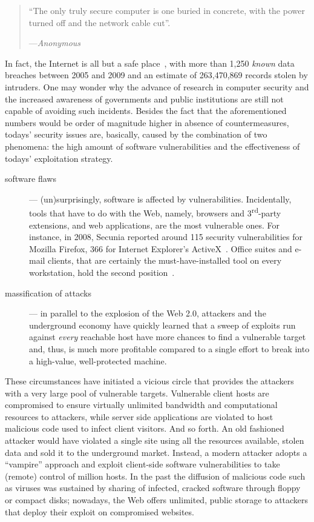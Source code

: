 \begin{quotation}
  ``The only truly secure computer is one buried in concrete, with the
  power turned off and the network cable cut''.

  ---\emph{Anonymous}
\end{quotation}

In fact, the Internet is all but a safe place~\citep{whid}, with more than 1,250 \emph{known} data breaches between 2005 and 2009 \citep{data-breaches-chronology} and an estimate of 263,470,869 records stolen by intruders. One may wonder why the advance of research in computer security and the increased awareness of governments and public institutions are still not capable of avoiding such incidents. Besides the fact that the aforementioned numbers would be order of magnitude higher in absence of countermeasures, todays' security issues are, basically, caused by the combination of two phenomena: the high amount of software vulnerabilities and the effectiveness of todays' exploitation strategy.

\begin{description}
\item[software flaws] --- (un)surprisingly, software is affected by
  vulnerabilities. Incidentally, tools that have to do with the Web,
  namely, browsers and 3\textsuperscript{rd}-party extensions, and web
  applications, are the most vulnerable ones. For instance, in 2008,
  \textsf{Secunia} reported around 115 security vulnerabilities for
  \textsf{Mozilla Firefox}, 366 for \textsf{Internet Explorer}'s
  \textsf{ActiveX}~\citep{secunia2008}. Office suites and e-mail
  clients, that are certainly the must\hyp{}have\hyp{}installed tool
  on every workstation, hold the second position~\citep{sans20}.
  
\item[massification of attacks] --- in parallel to the explosion of
  the Web 2.0, attackers and the underground economy have quickly
  learned that a sweep of exploits run against \emph{every} reachable
  host have more chances to find a vulnerable target and, thus, is
  much more profitable compared to a single effort to break into a
  high-value, well-protected machine.
\end{description}

These circumstances have initiated a vicious circle that provides the
attackers with a very large pool of vulnerable targets. Vulnerable
client hosts are compromised to ensure virtually unlimited bandwidth
and computational resources to attackers, while server side
applications are violated to host malicious code used to infect client
visitors. And so forth. An old fashioned attacker would have violated
a single site using all the resources available, stolen data and sold
it to the underground market. Instead, a modern attacker adopts a
``vampire'' approach and exploit client-side software vulnerabilities
to take (remote) control of million hosts. In the past the diffusion
of malicious code such as viruses was sustained by sharing of
infected, cracked software through floppy or compact disks; nowadays,
the Web offers unlimited, public storage to attackers that deploy
their exploit on compromised websites.

